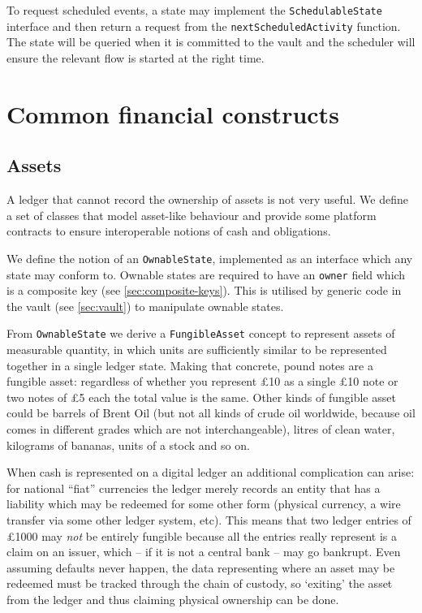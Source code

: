 \documentclass{article}
\begin{document}
To request scheduled events, a state may implement the \texttt{SchedulableState} interface and then return a
request from the \texttt{nextScheduledActivity} function. The state will be queried when it is committed to the
vault and the scheduler will ensure the relevant flow is started at the right time.

\section{Common financial constructs}\label{sec:assets}

\subsection{Assets}
A ledger that cannot record the ownership of assets is not very useful. We define a set of classes that model
asset-like behaviour and provide some platform contracts to ensure interoperable notions of cash and obligations.

We define the notion of an \texttt{OwnableState}, implemented as an interface which any state may conform to. Ownable
states are required to have an \texttt{owner} field which is a composite key (see \cref{sec:composite-keys}). This is
utilised by generic code in the vault (see \cref{sec:vault}) to manipulate ownable states.


From \texttt{OwnableState} we derive a \texttt{FungibleAsset} concept to represent assets of measurable quantity, in
which units are sufficiently similar to be represented together in a single ledger state. Making that concrete, pound notes
are a fungible asset: regardless of whether you represent \pounds10 as a single \pounds10 note or two notes of \pounds5
each the total value is the same. Other kinds of fungible asset could be barrels of Brent Oil (but not all kinds of
crude oil worldwide, because oil comes in different grades which are not interchangeable), litres of clean water,
kilograms of bananas, units of a stock and so on.

When cash is represented on a digital ledger an additional complication can arise: for national ``fiat'' currencies
the ledger merely records an entity that has a liability which may be redeemed for some other form (physical currency,
a wire transfer via some other ledger system, etc). This means that two ledger entries of \pounds1000 may \emph{not}
be entirely fungible because all the entries really represent is a claim on an issuer, which -- if it is not a central
bank -- may go bankrupt. Even assuming defaults never happen, the data representing where an asset may be redeemed
must be tracked through the chain of custody, so `exiting' the asset from the ledger and thus claiming physical
ownership can be done.
\end{document}
